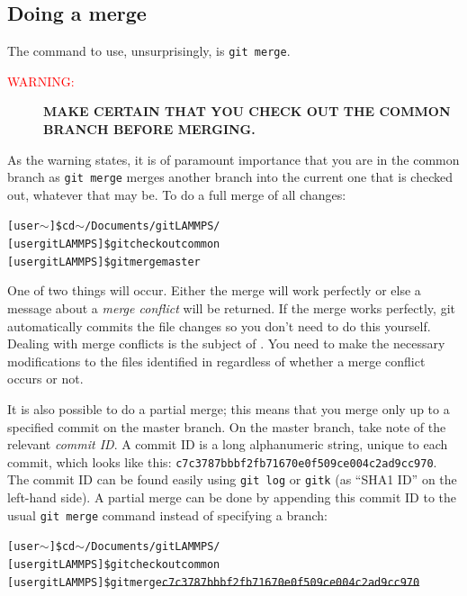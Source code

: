 \documentclass[a4paper,oneside,11pt]{article}
\begin{document}
\subsection{Doing a merge}
The command to use, unsurprisingly, is \texttt{git merge}.
\begin{description}
 \item[\textcolor{red}{WARNING:}] \bfseries\MakeUppercase{Make certain that you check out the common branch before merging.}
\end{description}
As the warning states, it is of paramount importance that you are in the common branch as \texttt{git merge} merges another branch into the current one that is checked out, whatever that may be. To do a full merge of all changes:
\begin{alltt}
[user \(\sim\)]\$ cd \(\sim\)/Documents/gitLAMMPS/
[user gitLAMMPS]\$ git checkout common
[user gitLAMMPS]\$ git merge master
\end{alltt}
One of two things will occur. Either the merge will work perfectly or else a message about a \emph{merge conflict} will be returned. If the merge works perfectly, git automatically commits the file changes so you don't need to do this yourself. Dealing with merge conflicts is the subject of . You need to make the necessary modifications to the files identified in  regardless of whether a merge conflict occurs or not.

It is also possible to do a partial merge; this means that you merge only up to a specified commit on the master branch. On the master branch, take note of the relevant \emph{commit ID}. A commit ID is a long alphanumeric string, unique to each commit, which looks like this: \texttt{c7c3787bbbf2fb71670e0f509ce004c2ad9cc970}. The commit ID can be found easily using \texttt{git log} or \texttt{gitk} (as ``SHA1 ID'' on the left-hand side). A partial merge can be done by appending this commit ID to the usual \texttt{git merge} command instead of specifying a branch:
\begin{alltt}
[user \(\sim\)]\$ cd \(\sim\)/Documents/gitLAMMPS/
[user gitLAMMPS]\$ git checkout common
[user gitLAMMPS]\$ git merge \sout{c7c3787bbbf2fb71670e0f509ce004c2ad9cc970}
\end{alltt}
\end{document}
